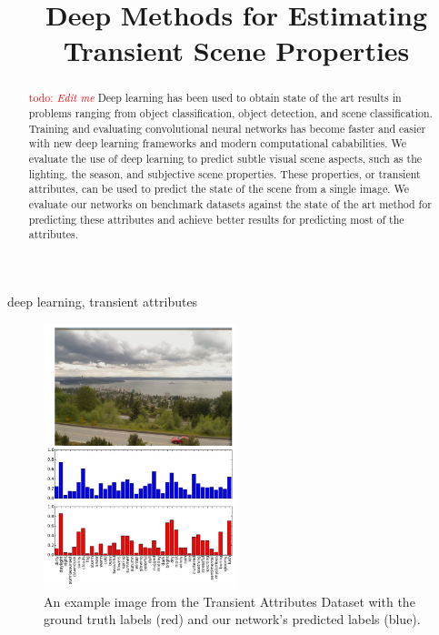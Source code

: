 \documentclass{article}
\title{Deep Methods for Estimating Transient Scene Properties}
\newcommand{\todo}[1]{\textcolor{red}{todo: {\em #1}}}
\begin{document}
%
\maketitle
%
\begin{abstract}
	
	\todo{Edit me}\newline\indent
	Deep learning has been used to obtain state of the art results in
  problems ranging from object classification, object detection, and
  scene classification.  Training and evaluating convolutional neural
	networks has become faster and easier with new deep learning 
	frameworks and modern computational cababilities.  We evaluate the 
	use of deep learning to predict subtle visual scene aspects, such as
	the lighting, the season, and subjective scene properties. These
	properties, or transient attributes, can be used to predict the 
	state of the scene from a single image.  We evaluate our networks
	on benchmark datasets against the state of the art method for 
	predicting these attributes and achieve better results for predicting
	most of the attributes.

\end{abstract}
%
\begin{keywords}
	deep learning, transient attributes
\end{keywords}

\begin{figure}[t!]
	\centering
		\includegraphics[width=0.5\textwidth]{figs/bars.pdf}
		\caption{An example image from the Transient Attributes Dataset with the ground truth labels
						 (red) and our network's predicted labels (blue).}\label{fig:sort}
\end{figure}
\end{document}
